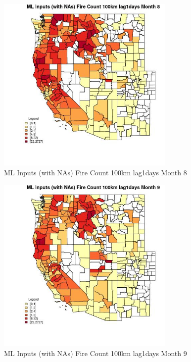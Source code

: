 \begin{figure} 
\centering  
\includegraphics[width=0.77\textwidth]{Code_Outputs/Report_ML_input_PM25_Step4_part_f_de_duplicated_aveswNAs_CountyFire_Count_100km_lag1daysmedianMonth8.jpg} 
\caption{\label{fig:Report_ML_input_PM25_Step4_part_f_de_duplicated_aveswNAsCountyFire_Count_100km_lag1daysmedianMonth8}ML Inputs (with NAs) Fire Count 100km lag1days Month 8} 
\end{figure} 
 

\clearpage 

\begin{figure} 
\centering  
\includegraphics[width=0.77\textwidth]{Code_Outputs/Report_ML_input_PM25_Step4_part_f_de_duplicated_aveswNAs_CountyFire_Count_100km_lag1daysmedianMonth9.jpg} 
\caption{\label{fig:Report_ML_input_PM25_Step4_part_f_de_duplicated_aveswNAsCountyFire_Count_100km_lag1daysmedianMonth9}ML Inputs (with NAs) Fire Count 100km lag1days Month 9} 
\end{figure} 
 

